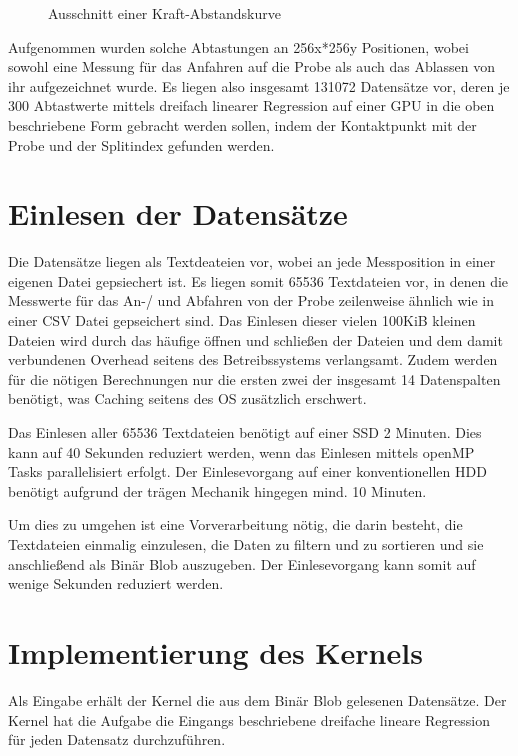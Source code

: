 \begin{figure}[h!]
\centering
\caption{Ausschnitt einer Kraft-Abstandskurve}
\label{fig:kraftbsp}
\end{figure}

Aufgenommen wurden solche Abtastungen an 256x*256y Positionen, wobei sowohl eine Messung für das Anfahren auf die Probe als auch das Ablassen von ihr aufgezeichnet wurde. Es liegen also insgesamt 131072 Datensätze vor, deren je 300 Abtastwerte mittels dreifach linearer Regression auf einer GPU in die oben beschriebene Form gebracht werden sollen, indem der Kontaktpunkt mit der Probe und der Splitindex gefunden werden.


\section{Einlesen der Datensätze}
Die Datensätze liegen als Textdeateien vor, wobei an jede Messposition in einer eigenen Datei gepsiechert ist. Es liegen somit 65536 Textdateien vor, in denen die Messwerte für das An-/ und Abfahren von der Probe zeilenweise ähnlich wie in einer CSV Datei gepseichert sind.
Das Einlesen dieser vielen 100KiB kleinen Dateien wird durch das häufige öffnen und schließen der Dateien und dem damit verbundenen Overhead seitens des Betreibssystems verlangsamt. Zudem werden für die nötigen Berechnungen nur die ersten zwei der insgesamt 14 Datenspalten benötigt, was Caching seitens des OS zusätzlich erschwert.


Das Einlesen aller 65536 Textdateien benötigt auf einer SSD 2 Minuten. Dies kann auf 40 Sekunden reduziert werden, wenn das Einlesen mittels openMP Tasks parallelisiert erfolgt.
Der Einlesevorgang auf einer konventionellen HDD benötigt aufgrund der trägen Mechanik hingegen mind. 10 Minuten.

Um dies zu umgehen ist eine Vorverarbeitung nötig, die darin besteht, die Textdateien einmalig einzulesen, die Daten zu filtern und zu sortieren und sie anschließend als Binär Blob auszugeben. Der Einlesevorgang kann somit auf wenige Sekunden reduziert werden.

\section{Implementierung des Kernels}
Als Eingabe erhält der Kernel die aus dem Binär Blob gelesenen Datensätze.
Der Kernel hat die Aufgabe die Eingangs beschriebene dreifache lineare Regression für jeden Datensatz durchzuführen.

